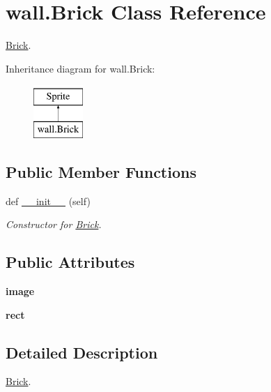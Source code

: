 \hypertarget{classwall_1_1_brick}{}\section{wall.\+Brick Class Reference}
\label{classwall_1_1_brick}


\mbox{\hyperlink{classwall_1_1_brick}{Brick}}.  


Inheritance diagram for wall.\+Brick\+:\begin{figure}[H]
\begin{center}
\leavevmode
\includegraphics[height=2.000000cm]{classwall_1_1_brick}
\end{center}
\end{figure}
\subsection*{Public Member Functions}
\begin{DoxyCompactItemize}
\item 
def \mbox{\hyperlink{classwall_1_1_brick_a9ab2fbab8a89de830d2fd433bf326269}{\+\_\+\+\_\+init\+\_\+\+\_\+}} (self)
\begin{DoxyCompactList}\small\item\em Constructor for \mbox{\hyperlink{classwall_1_1_brick}{Brick}}. \end{DoxyCompactList}\end{DoxyCompactItemize}
\subsection*{Public Attributes}
\begin{DoxyCompactItemize}
\item 
\mbox{\label{classwall_1_1_brick_af1d143f0f7ba7642a3942ca50a30d45c}} 
{\bfseries image}
\item 
\mbox{\label{classwall_1_1_brick_a0f6f1e234e181d441c35690749ca8e52}} 
{\bfseries rect}
\end{DoxyCompactItemize}


\subsection{Detailed Description}
\mbox{\hyperlink{classwall_1_1_brick}{Brick}}. 

